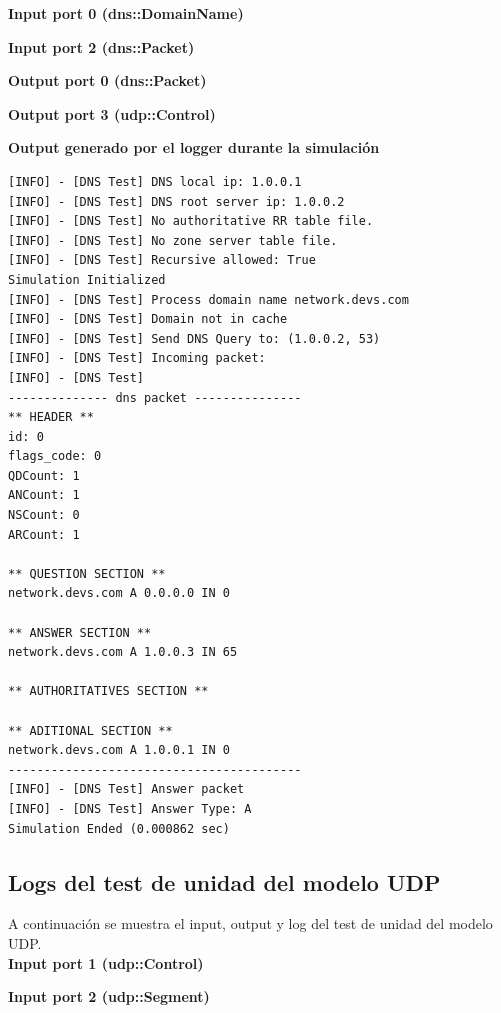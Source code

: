 \documentclass[10pt,a4paper]{article}
\begin{document}
\textbf{Input port 0 (dns::DomainName)}


\textbf{Input port 2 (dns::Packet)}


\textbf{Output port 0 (dns::Packet)}


\textbf{Output port 3 (udp::Control)}


\textbf{Output generado por el logger durante la simulación}
\begin{lstlisting}
[INFO] - [DNS Test] DNS local ip: 1.0.0.1
[INFO] - [DNS Test] DNS root server ip: 1.0.0.2
[INFO] - [DNS Test] No authoritative RR table file.
[INFO] - [DNS Test] No zone server table file.
[INFO] - [DNS Test] Recursive allowed: True
Simulation Initialized
[INFO] - [DNS Test] Process domain name network.devs.com
[INFO] - [DNS Test] Domain not in cache
[INFO] - [DNS Test] Send DNS Query to: (1.0.0.2, 53)
[INFO] - [DNS Test] Incoming packet:
[INFO] - [DNS Test] 
-------------- dns packet ---------------
** HEADER ** 
id: 0
flags_code: 0
QDCount: 1
ANCount: 1
NSCount: 0
ARCount: 1

** QUESTION SECTION ** 
network.devs.com A 0.0.0.0 IN 0 

** ANSWER SECTION ** 
network.devs.com A 1.0.0.3 IN 65 

** AUTHORITATIVES SECTION ** 

** ADITIONAL SECTION ** 
network.devs.com A 1.0.0.1 IN 0 
-----------------------------------------
[INFO] - [DNS Test] Answer packet
[INFO] - [DNS Test] Answer Type: A
Simulation Ended (0.000862 sec)
\end{lstlisting}

\subsection{Logs del test de unidad del modelo UDP}
\label{appendix: udp unit test}
A continuación se muestra el input, output y log del test de unidad del modelo UDP.\\

\textbf{Input port 1 (udp::Control)}


\textbf{Input port 2 (udp::Segment)}

\end{document}
